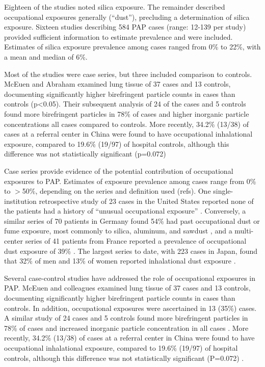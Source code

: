 \documentclass[a4
er,12pt]{article}
\begin{document}
Eighteen of the studies noted silica exposure.  The remainder described occupational exposures generally (“dust”), precluding a determination of silica exposure.  Sixteen studies describing 584 PAP cases (range: 12-139 per study) provided sufficient information to estimate prevalence and were included.  Estimates of silica exposure prevalence among cases ranged from 0\% to 22\%, with a mean and median of 6\%.  

Most of the studies were case series, but three included comparison to controls.  McEuen and Abraham examined lung tissue of 37 cases and 13 controls, documenting significantly higher birefringent particle counts in cases than controls (p<0.05).  Their subsequent analysis of 24 of the cases and 5 controls found more birefringent particles in 78\% of cases and higher inorganic particle concentrations all cases compared to controls.  More recently, 34.2\% (13/38) of cases at a referral center
in China were found to have occupational inhalational exposure, compared to 19.6\% (19/97) of hospital controls, although this difference was not statistically significant (p=0.072)   


Case series provide evidence of the potential contribution of occupational exposures to PAP.  Estimates of exposure prevalence among cases range from 0\% to \ensuremath{>}50\%, depending on the series and definition used (refs).  One single-institution retrospective study of 23 cases in the United States reported none of the patients had a history of “unusual occupational exposure” \cite{Kariman1984}.  Conversely, a similar series of 70 patients in Germany found 54\% had past occupational dust or fume
exposure, most commonly to silica, aluminum, and sawdust \cite{Bonella2011}, and a multi-center series of 41 patients from France reported a prevalence of occupational dust exposure of 39\% \cite{Briens2002}.  The largest series to date, with 223 cases in Japan, found that 32\% of men and 13\% of women reported inhalational dust exposure \cite{Inoue2008}.  

Several case-control studies have addressed the role of occupational exposures in PAP.  McEuen and colleagues \cite{McEuen1978} examined lung tissue of 37 cases and 13 controls, documenting significantly higher birefringent particle counts in cases than controls.  In addition, occupational exposures were ascertained in 13 (35\%) cases.  A similar study of 24 cases and 5 controls found more birefringent particles in 78\% of cases and increased inorganic particle concentration
in all cases \cite{Abraham1986}.  More recently, 34.2\% (13/38) of cases at a referral center in China were found to have occupational inhalational exposure, compared to 19.6\% (19/97) of hospital controls, although this difference was not statistically significant (P=0.072) \cite{Xiao2015}.   
\end{document}
